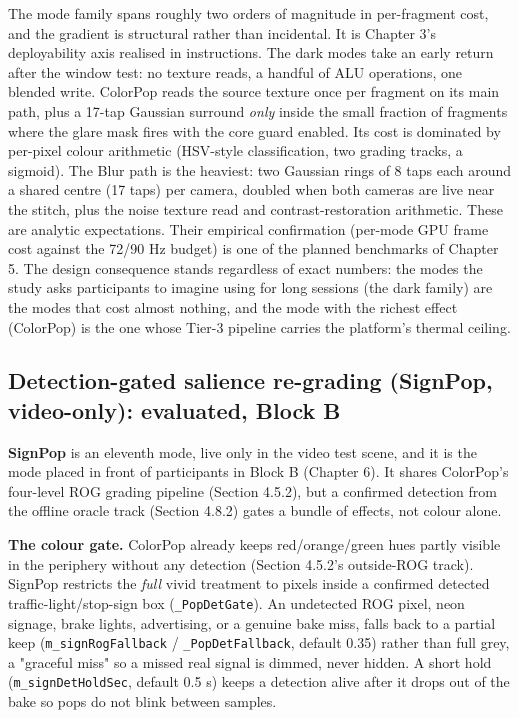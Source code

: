 The mode family spans roughly two orders of magnitude in per-fragment cost, and the gradient is
structural rather than incidental. It is Chapter 3's deployability axis realised in instructions. The
dark modes take an early return after the window test: no texture reads, a handful of ALU
operations, one blended write. ColorPop reads the source texture once per fragment on its main path,
plus a 17-tap Gaussian surround \textit{only} inside the small fraction of fragments where the glare mask
fires with the core guard enabled. Its cost is dominated by per-pixel colour arithmetic (HSV-style
classification, two grading tracks, a sigmoid). The Blur path is the heaviest: two Gaussian rings of
8 taps each around a shared centre (17 taps) per camera, doubled when both cameras are live near the
stitch, plus the noise texture read and contrast-restoration arithmetic. These are analytic
expectations. Their empirical confirmation (per-mode GPU frame cost against the 72/90 Hz budget) is
one of the planned benchmarks of Chapter 5. The design consequence stands regardless of exact
numbers: the modes the study asks participants to imagine using for long sessions (the dark family)
are the modes that cost almost nothing, and the mode with the richest effect (ColorPop) is the one
whose Tier-3 pipeline carries the platform's thermal ceiling.


\subsection{Detection-gated salience re-grading (SignPop, video-only): evaluated, Block B}

\textbf{SignPop} is an eleventh mode, live only in the video test scene, and it is the mode placed in
front of participants in Block B (Chapter 6). It shares ColorPop's four-level ROG grading pipeline
(Section 4.5.2),
but a confirmed detection from the offline oracle track (Section 4.8.2) gates a bundle of effects,
not colour alone.

\textbf{The colour gate.} ColorPop already keeps red/orange/green hues partly visible in the
periphery without any detection (Section 4.5.2's outside-ROG track). SignPop restricts the
\textit{full} vivid treatment to pixels inside a confirmed detected traffic-light/stop-sign box
(\verb|_PopDetGate|). An undetected ROG pixel, neon signage, brake lights, advertising, or a
genuine bake miss, falls back to a partial keep (\verb|m_signRogFallback| / \verb|_PopDetFallback|,
default 0.35) rather than full grey, a "graceful miss" so a missed real signal is dimmed, never
hidden. A short hold (\verb|m_signDetHoldSec|, default 0.5 s) keeps a detection alive after it drops
out of the bake so pops do not blink between samples.

